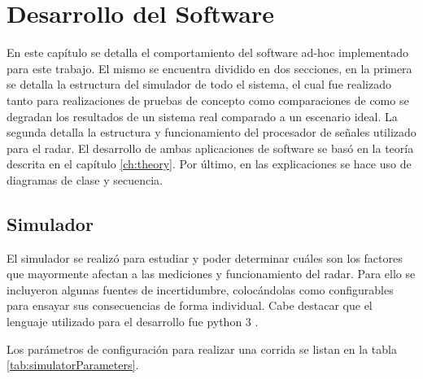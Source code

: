 \chapter{Desarrollo del Software} \label{ch:softwareDevelopment}

\ifpdf
    \graphicspath{{Chapter4/Figs/Raster/}{Chapter4/Figs/PDF/}{Chapter4/Figs/}}
\else
    \graphicspath{{Chapter4/Figs/Vector/}{Chapter4/Figs/}}
\fi

En este capítulo se detalla el comportamiento del software ad-hoc implementado para este trabajo. El mismo se encuentra dividido en dos secciones, en la primera se detalla la estructura del simulador de todo el sistema, el cual fue realizado tanto para realizaciones de pruebas de concepto como comparaciones de como se degradan los resultados de un sistema real comparado a un escenario ideal. La segunda detalla la estructura y funcionamiento del procesador de señales utilizado para el radar. El desarrollo de ambas aplicaciones de software se basó en la teoría descrita en el capítulo \ref{ch:theory}. Por último, en las explicaciones se hace uso de diagramas de clase y secuencia.

\section{Simulador}

El simulador se realizó para estudiar y poder determinar cuáles son los factores que mayormente afectan a las mediciones y funcionamiento del radar. Para ello se incluyeron algunas fuentes de incertidumbre, colocándolas como configurables para ensayar sus consecuencias de forma individual. Cabe destacar que el lenguaje utilizado para el desarrollo fue python 3 \cite{python3}.

Los parámetros de configuración para realizar una corrida se listan en la tabla \ref{tab:simulatorParameters}.

